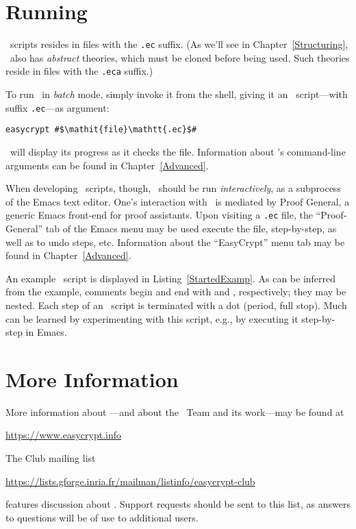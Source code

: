 \section{Running \EasyCrypt}

\EasyCrypt\ scripts resides in files with the \texttt{.ec} suffix. (As
we'll see in Chapter~\ref{Structuring}, \EasyCrypt\ also has
\emph{abstract} theories, which must be cloned before being used. Such
theories reside in files with the \texttt{.eca} suffix.)

To run
\EasyCrypt\ in \emph{batch} mode, simply invoke it from the shell,
giving it an \EasyCrypt\ script---with suffix \texttt{.ec}---as argument:
\begin{lstlisting}
easycrypt #$\mathit{file}\mathtt{.ec}$#
\end{lstlisting}
\EasyCrypt\ will display its progress as it checks the file.
Information about \EasyCrypt's command-line arguments can be found
in Chapter~\ref{Advanced}.

When developing \EasyCrypt\ scripts, though, \EasyCrypt\ should be run
\emph{interactively}, as a subprocess of the Emacs text editor. One's
interaction with \EasyCrypt\ is mediated by Proof General, a generic
Emacs front-end for proof assistants.  Upon visiting a \texttt{.ec}
file, the ``Proof-General'' tab of the Emacs menu may be used execute
the file, step-by-step, as well as to undo steps, etc. Information
about the ``EasyCrypt'' menu tab may be found in
Chapter~\ref{Advanced}.

An example \EasyCrypt\ script is displayed in
Listing~\ref{StartedExamp}.
As can be inferred from the example, comments begin and end with
\ec{(*} and \ec{*)}, respectively; they may be nested. Each step of an
\EasyCrypt\ script is terminated with a dot (period, full stop).  Much
can be learned by experimenting with this script, e.g., by executing
it step-by-step in Emacs.

\section{More Information}

More information about \EasyCrypt---and about the \EasyCrypt\ Team
and its work---may be found at
\begin{center}
  \url{https://www.easycrypt.info}
\end{center}
The \EasyCrypt Club mailing list
\begin{center}
  \url{https://lists.gforge.inria.fr/mailman/listinfo/easycrypt-club}
\end{center}
features discussion about \EasyCrypt.
Support requests should be sent to this list, as answers to questions
will be of use to additional users.

